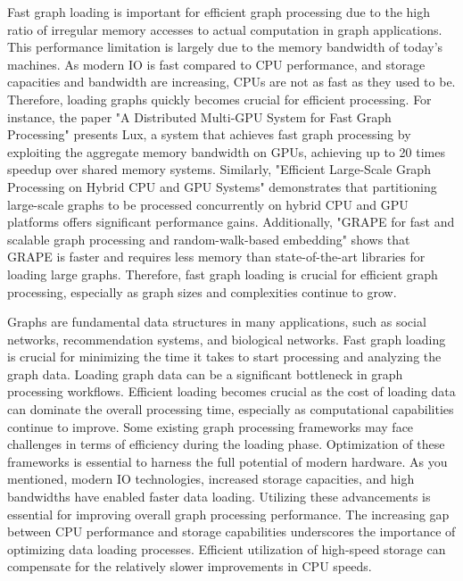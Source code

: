 Fast graph loading is important for efficient graph processing due to the high ratio of irregular memory accesses to actual computation in graph applications. This performance limitation is largely due to the memory bandwidth of today's machines. As modern IO is fast compared to CPU performance, and storage capacities and bandwidth are increasing, CPUs are not as fast as they used to be. Therefore, loading graphs quickly becomes crucial for efficient processing. For instance, the paper "A Distributed Multi-GPU System for Fast Graph Processing" presents Lux, a system that achieves fast graph processing by exploiting the aggregate memory bandwidth on GPUs, achieving up to 20 times speedup over shared memory systems. Similarly, "Efficient Large-Scale Graph Processing on Hybrid CPU and GPU Systems" demonstrates that partitioning large-scale graphs to be processed concurrently on hybrid CPU and GPU platforms offers significant performance gains. Additionally, "GRAPE for fast and scalable graph processing and random-walk-based embedding" shows that GRAPE is faster and requires less memory than state-of-the-art libraries for loading large graphs. Therefore, fast graph loading is crucial for efficient graph processing, especially as graph sizes and complexities continue to grow.


Graphs are fundamental data structures in many applications, such as social networks, recommendation systems, and biological networks. Fast graph loading is crucial for minimizing the time it takes to start processing and analyzing the graph data. Loading graph data can be a significant bottleneck in graph processing workflows. Efficient loading becomes crucial as the cost of loading data can dominate the overall processing time, especially as computational capabilities continue to improve. Some existing graph processing frameworks may face challenges in terms of efficiency during the loading phase. Optimization of these frameworks is essential to harness the full potential of modern hardware. As you mentioned, modern IO technologies, increased storage capacities, and high bandwidths have enabled faster data loading. Utilizing these advancements is essential for improving overall graph processing performance. The increasing gap between CPU performance and storage capabilities underscores the importance of optimizing data loading processes. Efficient utilization of high-speed storage can compensate for the relatively slower improvements in CPU speeds.

